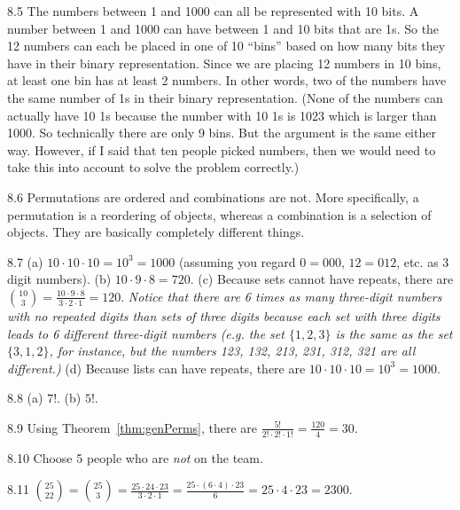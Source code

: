 \begin{RequAnswer}{8.5}
The numbers between 1 and 1000 can all be represented with 10 bits.
A number between 1 and 1000 can have between 1 and 10 bits that are 1s.
So the 12 numbers can each be placed in one of 10 ``bins'' based on how many
bits they have in their binary representation. Since we are placing 12 numbers in 10 bins,
at least one bin has at least 2 numbers. In other words, two of the numbers have the same number of 1s
in their binary representation.
(None of the numbers can actually have 10 1s because the number with 10 1s is 1023 which is larger than 1000.
So technically there are only 9 bins. But the argument is the same either way.
However, if I said that ten people picked numbers, then we would need to take this into account to solve the problem correctly.)
\end{RequAnswer}
\begin{RequAnswer}{8.6}
Permutations are ordered and combinations are not.
More specifically, a permutation is a reordering of objects,
whereas a combination is a selection of objects. They are basically completely different things.
\end{RequAnswer}
\begin{RequAnswer}{8.7}
(a) $10\cdot 10 \cdot 10 = 10^3=1000$ (assuming you regard $0=000$, $12=012$, etc. as 3 digit numbers).
(b) $10\cdot 9 \cdot 8 = 720$.
(c) Because sets cannot have repeats, there are $\binom{10}{3}=\frac{10\cdot 9 \cdot 8}{3\cdot 2 \cdot 1} = 120$.
{\em Notice that there are 6 times as many three-digit numbers with no repeated digits than sets of three digits because
each set with three digits leads to 6 different three-digit numbers (e.g. the set $\{1, 2, 3\}$ is the same as the set
$\{3,1,2\}$, for instance, but the numbers 123, 132, 213, 231, 312, 321 are all different.)}
(d) Because lists can have repeats, there are $10\cdot 10\cdot 10=10^3=1000$.
\end{RequAnswer}
\begin{RequAnswer}{8.8}
(a) $7!$.
(b) $5!$.
\end{RequAnswer}
\begin{RequAnswer}{8.9}
Using Theorem~\ref{thm:genPerms}, there are $\frac{5!}{2!\cdot 2!\cdot 1!} = \frac{120}{4}=30$.
\end{RequAnswer}
\begin{RequAnswer}{8.10}
Choose 5 people who are {\em not} on the team.
\end{RequAnswer}
\begin{RequAnswer}{8.11}
$\binom{25}{22} = \binom{25}{3}=\frac{25\cdot 24\cdot 23}{3\cdot 2\cdot 1}
= \frac{25\cdot (6\cdot 4)\cdot 23}{6} = 25\cdot 4\cdot 23 = 2300$.
\end{RequAnswer}
